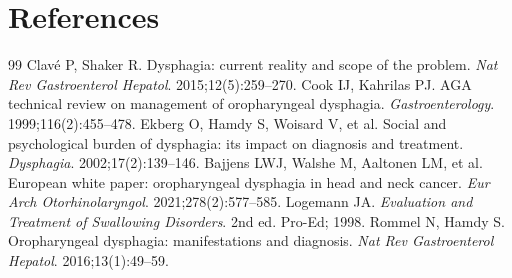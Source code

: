 \section*{References}
\begin{thebibliography}{99}
Clav\'{e} P, Shaker R. Dysphagia: current reality and scope of the problem. \textit{Nat Rev Gastroenterol Hepatol}. 2015;12(5):259--270.
Cook IJ, Kahrilas PJ. AGA technical review on management of oropharyngeal dysphagia. \textit{Gastroenterology}. 1999;116(2):455--478.
Ekberg O, Hamdy S, Woisard V, et al. Social and psychological burden of dysphagia: its impact on diagnosis and treatment. \textit{Dysphagia}. 2002;17(2):139--146.
Bajjens LWJ, Walshe M, Aaltonen LM, et al. European white paper: oropharyngeal dysphagia in head and neck cancer. \textit{Eur Arch Otorhinolaryngol}. 2021;278(2):577--585.
Logemann JA. \textit{Evaluation and Treatment of Swallowing Disorders}. 2nd ed. Pro-Ed; 1998.
Rommel N, Hamdy S. Oropharyngeal dysphagia: manifestations and diagnosis. \textit{Nat Rev Gastroenterol Hepatol}. 2016;13(1):49--59.
\end{thebibliography}

